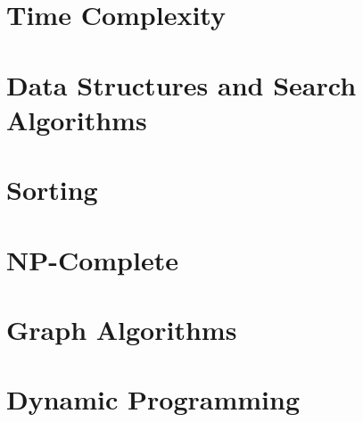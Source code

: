 \documentclass[11pt]{report}
\begin{document}
\begin{spacing}{1.2}



\chapter{Time Complexity}


\chapter{Data Structures and Search Algorithms}




\chapter{Sorting}


%


%

\chapter{NP-Complete}




\chapter{Graph Algorithms}









%

\chapter{Dynamic Programming}
%




\end{spacing}
\end{document}
